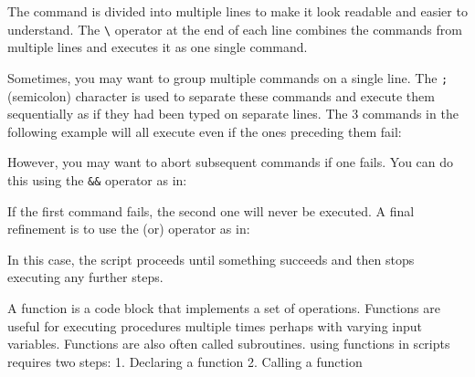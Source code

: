 The command is divided into multiple lines to make it look readable and
easier to understand. The \texttt{\textbackslash{}} operator at the end
of each line combines the commands from multiple lines and executes it
as one single command.

Sometimes, you may want to group multiple commands on a single line. The
\texttt{;} (semicolon) character is used to separate these commands and
execute them sequentially as if they had been typed on separate lines.
The 3 commands in the following example will all execute even if the
ones preceding them fail:

\begin{Shaded}
\begin{Highlighting}[]
\NormalTok{$ } \KeywordTok{;}  \KeywordTok{;}  
\end{Highlighting}
\end{Shaded}

However, you may want to abort subsequent commands if one fails. You can
do this using the \texttt{\&\&} operator as in:

\begin{Shaded}
\begin{Highlighting}[]
\NormalTok{$ } \KeywordTok{&&}  \KeywordTok{&&}  
\end{Highlighting}
\end{Shaded}

If the first command fails, the second one will never be executed. A
final refinement is to use the \texttt{\textbar{}\textbar{}} (or)
operator as in:

\begin{Shaded}
\begin{Highlighting}[]
\NormalTok{$ } \KeywordTok{||}  \KeywordTok{||}  
\end{Highlighting}
\end{Shaded}

In this case, the script proceeds until something succeeds and then
stops executing any further steps.

A function is a code block that implements a set of operations.
Functions are useful for executing procedures multiple times perhaps
with varying input variables. Functions are also often called
subroutines. using functions in scripts requires two steps: 1. Declaring
a function 2. Calling a function

